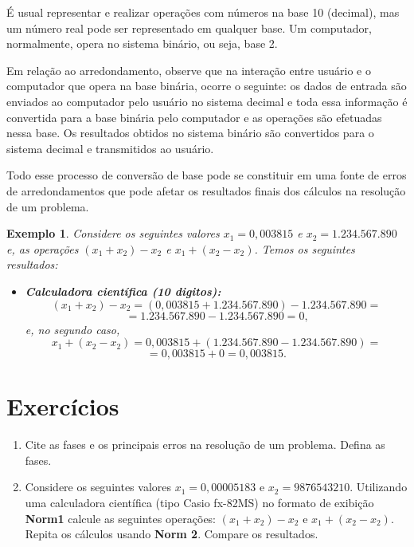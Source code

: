 \documentclass[12pt,a4paper]{book}
\newtheorem{example}{Exemplo}
\numberwithin{example}{chapter}
\numberwithin{remark}{chapter}
\numberwithin{definition}{chapter}
\begin{document}
É usual representar e realizar operações com números na base 10 (decimal), mas um número real pode ser representado em qualquer base. Um computador, normalmente, opera no sistema binário, ou seja, base 2.

Em relação ao arredondamento, observe que na interação entre usuário e o computador que opera na base binária, ocorre o seguinte: os dados de entrada são enviados ao computador pelo usuário no sistema decimal e toda essa informação é convertida para a base binária pelo computador e as operações são efetuadas nessa base. Os resultados obtidos no sistema binário são convertidos para o sistema decimal e transmitidos ao usuário.

Todo esse processo de conversão de base pode se constituir em uma fonte de erros de arredondamentos que pode afetar os resultados finais dos cálculos na resolução de um problema.

\begin{example}
	\label{example:x_1_x2_calculadora}
	Considere os seguintes valores $x_1=0,003815$ e $x_2=1.234.567.890$ e, as operações $(x_1+x_2)-x_2$ e $x_1+(x_2-x_2)$. Temos os seguintes resultados:

	\begin{itemize}
		\item \textbf{Calculadora científica (10 digitos):}\hfill
		$$(x_1+x_2)-x_2=(0,003815+1.234.567.890)-1.234.567.890=$$
		$$=1.234.567.890-1.234.567.890=0\text{,}$$
		e, no segundo caso,
		$$x_1+(x_2-x_2)=0,003815+(1.234.567.890-1.234.567.890)=$$
		$$=0,003815+0=0,003815\text{.}$$
	\end{itemize}
\end{example}


\section{Exercícios}

\begin{enumerate}
    \item Cite as fases e os principais erros na resolução de um problema. Defina as fases.
    
    \item Considere os seguintes valores $x_1=0,00005183$ e $x_2=9876543210$. Utilizando uma calculadora científica (tipo Casio fx-82MS) no formato de exibição \textbf{Norm1} calcule as seguintes operações: $(x_1+x_2)-x_2$ e $x_1+(x_2-x_2)$. Repita os cálculos usando \textbf{Norm 2}. Compare os resultados.
\end{enumerate}
\end{document}
